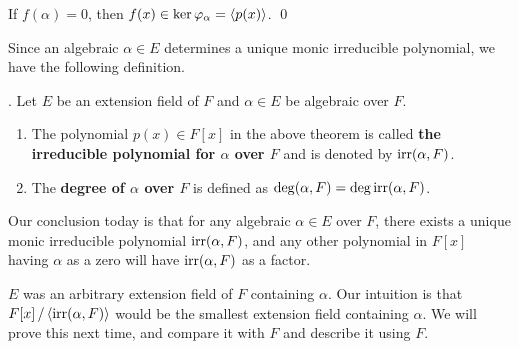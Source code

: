  If \(f(\alpha) = 0\), then \(f(x) \in \ker\varphi_\alpha = \left\langle p(x) \right\rangle\). \qed

Since an algebraic \(\alpha \in E\) determines a unique monic irreducible polynomial, we have the following definition.

. Let \(E\) be an extension field of \(F\) and \(\alpha \in E\) be algebraic over \(F\).
\begin{enumerate}
    \item The polynomial \(p(x) \in F[x]\) in the above theorem is called \textbf{the irreducible polynomial for \(\alpha\) over \(F\)} and is denoted by \(\mathrm{irr}(\alpha, F)\).
    \item The \textbf{degree of \(\alpha\) over \(F\)} is defined as \(\deg (\alpha, F) = \deg \mathrm{irr}(\alpha, F)\).
\end{enumerate}

Our conclusion today is that for any algebraic \(\alpha \in E\) over \(F\), there exists a unique monic irreducible polynomial \(\mathrm{irr}(\alpha, F)\), and any other polynomial in \(F[x]\) having \(\alpha\) as a zero will have \(\mathrm{irr}(\alpha, F)\) as a factor.

\(E\) was an arbitrary extension field of \(F\) containing \(\alpha\). Our intuition is that \(F[x] \operatorname{/} \left\langle \mathrm{irr}(\alpha, F) \right\rangle\) would be the smallest extension field containing \(\alpha\). We will prove this next time, and compare it with \(F\) and describe it using \(F\).

\pagebreak
